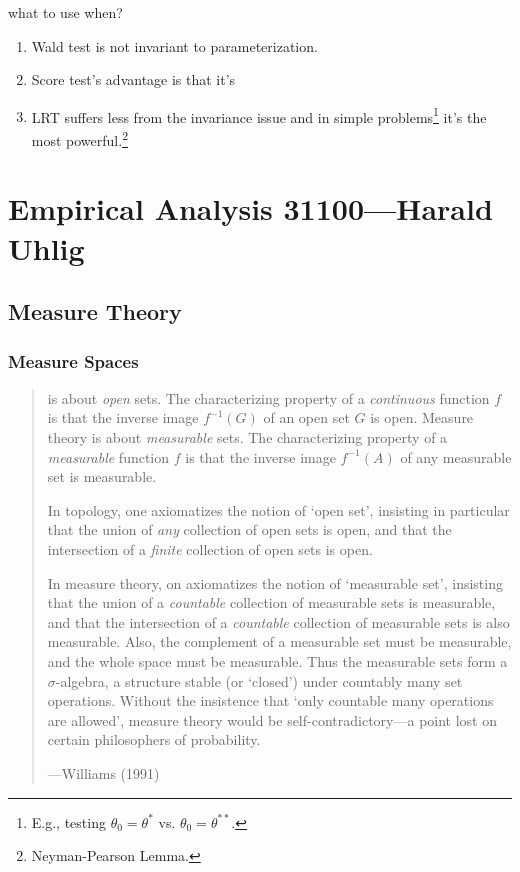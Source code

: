 \documentclass{tufte-book}
\theoremstyle{mytheoremstyle}
\theoremstyle{mylemstyle}
\theoremstyle{mydefstyle}
\begin{document}
 what to use when? \begin{enumerate}
\item Wald test is not invariant to parameterization. 
\item Score test's advantage is that it's
\item LRT suffers less from the invariance issue and in simple problems\footnote{E.g., testing \(\theta_0 = \theta^*\) vs. \(\theta_0 = \theta^{**}\).} it's the most powerful.\footnote{Neyman-Pearson Lemma.}
\end{enumerate}

\part{Empirical Analysis 31100---Harald Uhlig}

\chapter{Measure Theory}

\section{Measure Spaces}
\begin{quote}  is about \emph{open} sets. The characterizing property of a \emph{continuous} function \(f\) is that the inverse image \(f^{-1}(G)\) of an open set \(G\) is open. Measure theory is about \emph{measurable} sets. The characterizing property of a \emph{measurable} function \(f\) is that the inverse image \(f^{-1}(A)\) of any measurable set is measurable.

In topology, one axiomatizes the notion of `open set', insisting in particular that the union of \emph{any} collection of open sets is open, and that the intersection of a \emph{finite} collection of open sets is open.

In measure theory, on axiomatizes the notion of `measurable set', insisting that the union of a \emph{countable} collection of measurable sets is measurable, and that the intersection of a \emph{countable} collection of measurable sets is also measurable. Also, the complement of a measurable set must be measurable, and the whole space must be measurable. Thus the measurable sets form a \(\sigma\)-algebra, a structure stable (or `closed') under countably many set operations. Without the insistence that `only countable many operations are allowed', measure theory would be self-contradictory---a point lost on certain philosophers of probability.

\noindent ---Williams (1991)
\end{quote}
\end{document}
